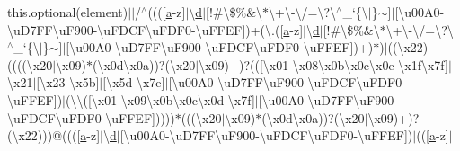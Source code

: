 \begin{DoxyCompactItemize}
this.\+optional(element)$\vert$$\vert$/$^\wedge$(((\mbox{[}\hyperlink{packages_2bootstrap_83_80_80_2content_2_scripts_2bootstrap_8min_8js_a7318f59fb86a4437995ee89c780c51ac}{a}-\/z\mbox{]}$\vert$\textbackslash{}\hyperlink{packages_2_respond_81_82_80_2content_2_scripts_2respond_8min_8js_aeb337d295abaddb5ec3cb34cc2e2bbc9}{d}$\vert$\mbox{[}!\#\textbackslash{}\$\%\&\textquotesingle{}\textbackslash{}$\ast$\textbackslash{}+\textbackslash{}-\/\textbackslash{}/=\textbackslash{}?\textbackslash{}$^\wedge$\+\_\+`\{\textbackslash{}$\vert$\}$\sim$\mbox{]}$\vert$\mbox{[}\textbackslash{}u00\+A0-\/\textbackslash{}u\+D7\+F\+F\textbackslash{}u\+F900-\/\textbackslash{}u\+F\+D\+C\+F\textbackslash{}u\+F\+D\+F0-\/\textbackslash{}u\+F\+F\+E\+F\mbox{]})+(\textbackslash{}.(\mbox{[}\hyperlink{packages_2bootstrap_83_80_80_2content_2_scripts_2bootstrap_8min_8js_a7318f59fb86a4437995ee89c780c51ac}{a}-\/z\mbox{]}$\vert$\textbackslash{}\hyperlink{packages_2_respond_81_82_80_2content_2_scripts_2respond_8min_8js_aeb337d295abaddb5ec3cb34cc2e2bbc9}{d}$\vert$\mbox{[}!\#\textbackslash{}\$\%\&\textquotesingle{}\textbackslash{}$\ast$\textbackslash{}+\textbackslash{}-\/\textbackslash{}/=\textbackslash{}?\textbackslash{}$^\wedge$\+\_\+`\{\textbackslash{}$\vert$\}$\sim$\mbox{]}$\vert$\mbox{[}\textbackslash{}u00\+A0-\/\textbackslash{}u\+D7\+F\+F\textbackslash{}u\+F900-\/\textbackslash{}u\+F\+D\+C\+F\textbackslash{}u\+F\+D\+F0-\/\textbackslash{}u\+F\+F\+E\+F\mbox{]})+)$\ast$)$\vert$((\textbackslash{}x22)((((\textbackslash{}x20$\vert$\textbackslash{}x09)$\ast$(\textbackslash{}x0d\textbackslash{}x0a))?(\textbackslash{}x20$\vert$\textbackslash{}x09)+)?((\mbox{[}\textbackslash{}x01-\/\textbackslash{}x08\textbackslash{}x0b\textbackslash{}x0c\textbackslash{}x0e-\/\textbackslash{}x1f\textbackslash{}x7f\mbox{]}$\vert$\textbackslash{}x21$\vert$\mbox{[}\textbackslash{}x23-\/\textbackslash{}x5b\mbox{]}$\vert$\mbox{[}\textbackslash{}x5d-\/\textbackslash{}x7e\mbox{]}$\vert$\mbox{[}\textbackslash{}u00\+A0-\/\textbackslash{}u\+D7\+F\+F\textbackslash{}u\+F900-\/\textbackslash{}u\+F\+D\+C\+F\textbackslash{}u\+F\+D\+F0-\/\textbackslash{}u\+F\+F\+E\+F\mbox{]})$\vert$(\textbackslash{}\textbackslash{}(\mbox{[}\textbackslash{}x01-\/\textbackslash{}x09\textbackslash{}x0b\textbackslash{}x0c\textbackslash{}x0d-\/\textbackslash{}x7f\mbox{]}$\vert$\mbox{[}\textbackslash{}u00\+A0-\/\textbackslash{}u\+D7\+F\+F\textbackslash{}u\+F900-\/\textbackslash{}u\+F\+D\+C\+F\textbackslash{}u\+F\+D\+F0-\/\textbackslash{}u\+F\+F\+E\+F\mbox{]}))))$\ast$(((\textbackslash{}x20$\vert$\textbackslash{}x09)$\ast$(\textbackslash{}x0d\textbackslash{}x0a))?(\textbackslash{}x20$\vert$\textbackslash{}x09)+)?(\textbackslash{}x22)))@(((\mbox{[}\hyperlink{packages_2bootstrap_83_80_80_2content_2_scripts_2bootstrap_8min_8js_a7318f59fb86a4437995ee89c780c51ac}{a}-\/z\mbox{]}$\vert$\textbackslash{}\hyperlink{packages_2_respond_81_82_80_2content_2_scripts_2respond_8min_8js_aeb337d295abaddb5ec3cb34cc2e2bbc9}{d}$\vert$\mbox{[}\textbackslash{}u00\+A0-\/\textbackslash{}u\+D7\+F\+F\textbackslash{}u\+F900-\/\textbackslash{}u\+F\+D\+C\+F\textbackslash{}u\+F\+D\+F0-\/\textbackslash{}u\+F\+F\+E\+F\mbox{]})$\vert$((\mbox{[}\hyperlink{packages_2bootstrap_83_80_80_2content_2_scripts_2bootstrap_8min_8js_a7318f59fb86a4437995ee89c780c51ac}{a}-\/z\mbox{]}$\vert$\textbacks
\end{DoxyCompactItemize}

